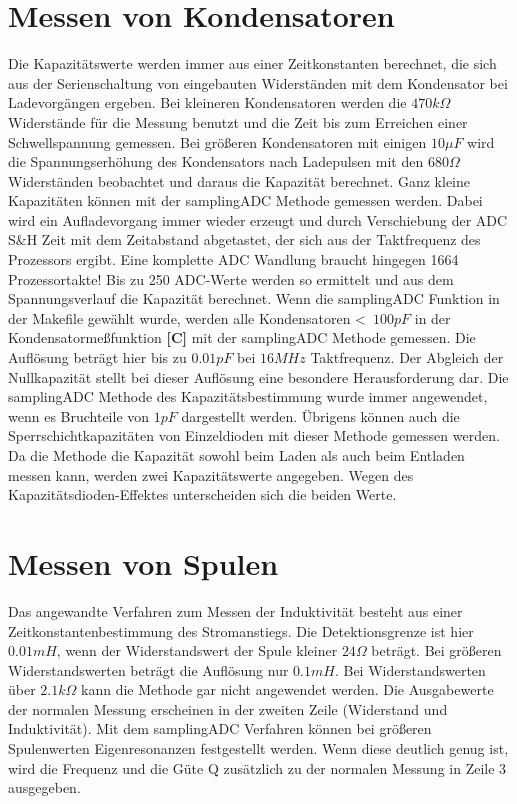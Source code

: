 \section{Messen von Kondensatoren}
Die Kapazitätswerte werden immer aus einer Zeitkonstanten berechnet, die sich aus der Serienschaltung von eingebauten
Widerständen mit dem Kondensator bei Ladevorgängen ergeben. Bei kleineren Kondensatoren werden die \(470k\Omega\) Widerstände
für die Messung benutzt und die Zeit bis zum Erreichen einer Schwellspannung gemessen.
Bei größeren Kondensatoren mit einigen \(10\mu F\) wird die Spannungserhöhung des Kondensators nach Ladepulsen mit den \(680\Omega\) Widerständen 
beobachtet und daraus die Kapazität berechnet. Ganz kleine Kapazitäten können mit der samplingADC Methode gemessen werden.
Dabei wird ein Aufladevorgang immer wieder erzeugt und durch Verschiebung der ADC S\&H Zeit mit dem Zeitabstand abgetastet,
der sich aus der Taktfrequenz des Prozessors ergibt. Eine komplette ADC Wandlung braucht hingegen 1664 Prozessortakte!
Bis zu 250 ADC-Werte werden so ermittelt und aus dem Spannungsverlauf die Kapazität berechnet.
Wenn die samplingADC Funktion in der Makefile gewählt wurde, werden alle Kondensatoren \textless~\(100pF\) in der 
Kondensatormeßfunktion  {\bf[C]} mit der samplingADC Methode gemessen. Die Auflösung beträgt hier bis zu \(0.01pF\) bei
\(16MHz\) Taktfrequenz. Der Abgleich der Nullkapazität stellt bei dieser Auflösung eine besondere Herausforderung dar.
Die samplingADC Methode des Kapazitätsbestimmung wurde immer angewendet, wenn es Bruchteile von \(1pF\) dargestellt werden.
Übrigens können auch die Sperrschichtkapazitäten von Einzeldioden mit dieser Methode gemessen werden. Da die Methode
die Kapazität sowohl beim Laden als auch beim Entladen messen kann, werden zwei Kapazitätswerte angegeben. Wegen
des Kapazitätsdioden-Effektes unterscheiden sich die beiden Werte.

\section{Messen von Spulen}
Das angewandte Verfahren zum Messen der Induktivität besteht aus einer Zeitkonstantenbestimmung des Stromanstiegs.
Die Detektionsgrenze ist hier \(0.01mH\), wenn der Widerstandswert der Spule kleiner \(24\Omega\) beträgt.
Bei größeren Widerstandswerten beträgt die Auflösung nur \(0.1mH\).
Bei Widerstandswerten über \(2.1k\Omega\) kann die Methode gar nicht angewendet werden. 
Die Ausgabewerte der normalen Messung erscheinen in der zweiten Zeile (Widerstand und Induktivität).
Mit dem samplingADC Verfahren können bei größeren Spulenwerten Eigenresonanzen festgestellt werden.
Wenn diese deutlich genug ist, wird die Frequenz und die Güte Q zusätzlich zu der normalen Messung in Zeile 3 ausgegeben.

